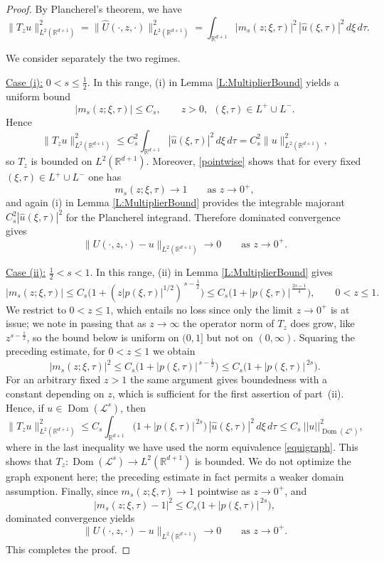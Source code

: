 \documentclass[11pt,letter]{amsart}
\def \RNu {\mathbb{R}^{d+1}}
\def \R {\mathbb{R}}
\numberwithin{equation}{section}
\newcommand{\Le}{\mathcal L}
\newcommand{\Dom}{\operatorname{Dom}}
\numberwithin{equation}{section}
\begin{document}
\begin{proof}
By Plancherel's theorem, we have
\[
\|T_zu\|_{L^2(\RNu)}^2 = \|\widehat{U}(\cdot,z,\cdot)\|_{L^2(\RNu)}^2
=
\int_{\R^{d+1}}
|m_s(z;\xi,\tau)|^2\,|\widehat u(\xi,\tau)|^2\,d\xi\,d\tau.
\]

We consider separately the two regimes.

\smallskip

\noindent \underline{Case (i):} $0<s\le \frac12$.
In this range, (i) in Lemma \ref{L:MultiplierBound}
 yields a uniform bound
\[
|m_s(z;\xi,\tau)|\le C_s,
\qquad z>0,\ \ (\xi,\tau)\in L^+\cup L^-.
\]
Hence
\[
\|T_zu\|_{L^2(\R^{d+1})}^2
\le
C_s^2 \int_{\R^{d+1}} |\widehat u(\xi,\tau)|^2\,d\xi\,d\tau
=
C_s^2 \|u\|_{L^2(\R^{d+1})}^2,
\]
so $T_z$ is bounded on $L^2(\RNu)$.
Moreover, \eqref{pointwise} shows that for every fixed $(\xi,\tau)\in L^+\cup L^-$ one has 
\[
m_s(z;\xi,\tau)\longrightarrow 1
\qquad\text{as }z\to0^+,
\]
and again (i) in Lemma \ref{L:MultiplierBound} provides the integrable majorant $C_s^2|\widehat u(\xi,\tau)|^2$ for the Plancherel integrand.
Therefore dominated convergence gives
\[
\|U(\cdot,z,\cdot)-u\|_{L^2(\R^{d+1})}\to0
\qquad\text{as }z\to0^+.
\]

\smallskip

\noindent\underline{Case (ii):} $\frac12<s<1$.
In this range, (ii) in Lemma \ref{L:MultiplierBound} gives
\[
|m_s(z;\xi,\tau)|
\le
C_s\bigl(1+(z|p(\xi,\tau)|^{1/2})^{\,s-\frac12}\bigr)
\le C_s\bigl(1+|p(\xi,\tau)|^{\,\frac{2s-1}{4}}\bigr),
\qquad 0<z\le1 .
\]
We restrict to $0<z\le1$, which entails no loss since only the limit $z\to0^+$
is at issue; we note in passing that as $z\to\infty$ the operator norm of $T_z$
does grow, like $z^{s-\frac12}$, so the bound below is uniform on $(0,1]$ but
not on $(0,\infty)$. Squaring the preceding estimate, for $0<z\le1$ we obtain
\[
|m_s(z;\xi,\tau)|^2
\le C_s\bigl(1+|p(\xi,\tau)|^{\,s-\frac12}\bigr)
\le C_s\bigl(1+|p(\xi,\tau)|^{\,2s}\bigr).
\]
For an arbitrary fixed $z>1$ the same argument gives boundedness with a
constant depending on $z$, which is sufficient for the first assertion of
part~(ii).
Hence, if $u\in\Dom(\Le^s)$, then
\[
\|T_zu\|_{L^2(\RNu)}^2
\le
C_s
\int_{\RNu}
\bigl(1+|p(\xi,\tau)|^{\,2s}\bigr)\,|\widehat u(\xi,\tau)|^2\,d\xi\,d\tau \le C_s\ ||u||^2_{\Dom(\Le^s)},
\]
where in the last inequality we have used the norm equivalence \eqref{equigraph}. This shows that $T_z:\Dom(\Le^s)\to L^2(\RNu)$ is bounded. We do not optimize the graph exponent here; the preceding estimate in fact permits a weaker domain assumption.
Finally, since \(m_s(z;\xi,\tau)\to1\) pointwise as \(z\to0^+\), and
\[
|m_s(z;\xi,\tau)-1|^2
\le
C_s\bigl(1+|p(\xi,\tau)|^{\,2s}\bigr),
\]
dominated convergence yields
\[
\|U(\cdot,z,\cdot)-u\|_{L^2(\R^{d+1})}\to0
\qquad\text{as }z\to0^+.
\]
This completes the proof.

\end{proof}
\end{document}
